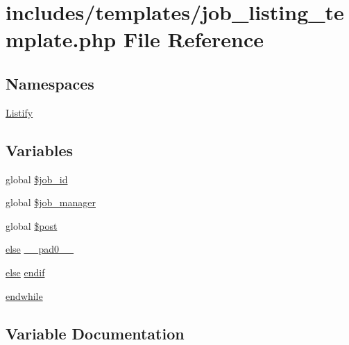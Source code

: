 \hypertarget{job__listing__template_8php}{}\section{includes/templates/job\+\_\+listing\+\_\+template.php File Reference}
\label{job__listing__template_8php}
\subsection*{Namespaces}
\begin{DoxyCompactItemize}
\item 
 \hyperlink{namespace_listify}{Listify}
\end{DoxyCompactItemize}
\subsection*{Variables}
\begin{DoxyCompactItemize}
\item 
global \hyperlink{job__listing__template_8php_a30853d9b1892cd0f6caeac10d3a0770f}{\$job\+\_\+id}
\item 
global \hyperlink{job__listing__template_8php_ac1b9ffb3acf9d324b2f28d6a1b886f0b}{\$job\+\_\+manager}
\item 
global \hyperlink{job__listing__template_8php_a77c8faa27a630e0cfbe0fa5507c1a538}{\$post}
\item 
\hyperlink{delete__badge_8php_a8d42525897d9dd0c69ce4bed62cf3985}{else} \hyperlink{job__listing__template_8php_a8e01dcc96c43199448ee66f7c2ae8ea6}{\+\_\+\+\_\+pad0\+\_\+\+\_\+}
\item 
\hyperlink{delete__badge_8php_a8d42525897d9dd0c69ce4bed62cf3985}{else} \hyperlink{job__listing__template_8php_a82cd33ca97ff99f2fcc5e9c81d65251b}{endif}
\item 
\hyperlink{job__listing__template_8php_a1b05dae45f9e3f4c1fe86048550d2c5b}{endwhile}
\end{DoxyCompactItemize}


\subsection{Variable Documentation}
\mbox{\label{job__listing__template_8php_a30853d9b1892cd0f6caeac10d3a0770f}} 
